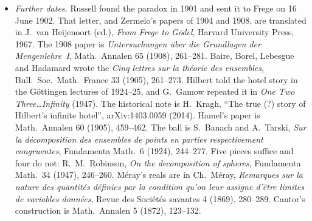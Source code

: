 \begin{itemize}
\item \emph{Further dates.} Russell found the paradox in 1901 and sent it to Frege on 16 June 1902. That letter, and Zermelo's papers of 1904 and 1908, are translated in J.~van Heijenoort (ed.), \emph{From Frege to G\"odel}, Harvard University Press, 1967. The 1908 paper is \emph{Untersuchungen \"uber die Grundlagen der Mengenlehre~I}, Math.\ Annalen 65 (1908), 261--281. Baire, Borel, Lebesgue and Hadamard wrote the \emph{Cinq lettres sur la th\'eorie des ensembles}, Bull.\ Soc.\ Math.\ France 33 (1905), 261--273. Hilbert told the hotel story in the G\"ottingen lectures of 1924--25, and G.~Gamow repeated it in \emph{One Two Three\ldots Infinity} (1947). The historical note is H.~Kragh, ``The true (?) story of Hilbert's infinite hotel'', arXiv:1403.0059 (2014). Hamel's paper is Math.\ Annalen 60 (1905), 459--462. The ball is S.~Banach and A.~Tarski, \emph{Sur la d\'ecomposition des ensembles de points en parties respectivement congruentes}, Fundamenta Math.\ 6 (1924), 244--277. Five pieces suffice and four do not: R.~M.~Robinson, \emph{On the decomposition of spheres}, Fundamenta Math.\ 34 (1947), 246--260. M\'eray's reals are in Ch.~M\'eray, \emph{Remarques sur la nature des quantit\'es d\'efinies par la condition qu'on leur assigne d'\^etre limites de variables donn\'ees}, Revue des Soci\'et\'es savantes 4 (1869), 280--289. Cantor's construction is Math.\ Annalen 5 (1872), 123--132.
\end{itemize}
